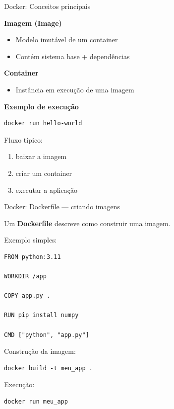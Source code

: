 \documentclass{beamer}
\begin{document}
\begin{frame}[fragile]{Docker: Conceitos principais}
    
    \textbf{Imagem (Image)}
    
    \begin{itemize}
        \item Modelo imutável de um container
        \item Contém sistema base + dependências
    \end{itemize}
    
    \textbf{Container}
    
    \begin{itemize}
        \item Instância em execução de uma imagem
    \end{itemize}
    
    \textbf{Exemplo de execução}
    
    \begin{verbatim}
docker run hello-world
    \end{verbatim}
    
    Fluxo típico:
    
    \begin{enumerate}
        \item baixar a imagem
        \item criar um container
        \item executar a aplicação
    \end{enumerate}
    
\end{frame}

\begin{frame}[fragile]{Docker: Dockerfile — criando imagens}
    
    Um \textbf{Dockerfile} descreve como construir uma imagem.
    
    Exemplo simples:
    
    \begin{verbatim}
FROM python:3.11

WORKDIR /app

COPY app.py .

RUN pip install numpy

CMD ["python", "app.py"]
    \end{verbatim}
    
    Construção da imagem:
    
    \begin{verbatim}
docker build -t meu_app .
    \end{verbatim}
    
    Execução:
    
    \begin{verbatim}
docker run meu_app
    \end{verbatim}
    
\end{frame}
\end{document}
